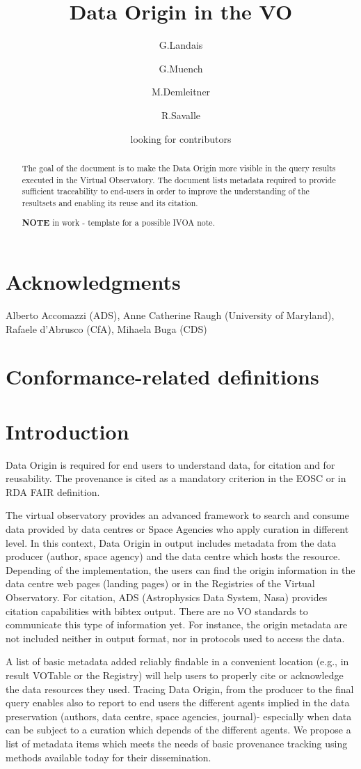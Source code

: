 \documentclass[11pt,a4paper]{ivoa}
\title{Data Origin in the VO}
\author{G.Landais}
\author{G.Muench}
\author{M.Demleitner}
\author{R.Savalle}
\author{looking for contributors}
\begin{document}
\begin{abstract}
The goal of the document is to make the Data Origin more visible in the query results executed in the Virtual Observatory.
The document lists metadata required to provide sufficient traceability to end-users in order to improve the understanding
of the resultsets and enabling its reuse and its citation.

\textbf{NOTE} in work -  template for a possible IVOA note.


\end{abstract}


\section*{Acknowledgments}
Alberto Accomazzi (ADS), Anne Catherine Raugh (University of Maryland), Rafaele d'Abrusco (CfA), Mihaela Buga (CDS)

\section*{Conformance-related definitions}


\section{Introduction}

Data Origin is required for end users to understand data, for citation and for reusability. The  provenance is cited as a mandatory criterion in the EOSC or in RDA FAIR definition.

The virtual observatory provides an advanced framework to search and consume data provided by data centres or Space Agencies who apply curation in different level.  In this context, Data Origin in output includes metadata from the data producer (author, space agency) and the data centre which hosts the resource.
Depending of the implementation, the users can find the origin information in the data centre web pages (landing pages) or in the Registries of the Virtual Observatory. For citation, ADS (Astrophysics Data System, Nasa) provides citation capabilities with bibtex output. There are no VO standards to communicate this type of information yet. For instance, the origin metadata are not included neither in output format, nor in protocols used to access the data.

A list of basic metadata added reliably findable in a convenient location (e.g.,
in result VOTable or the Registry) will help users to properly cite or
acknowledge the data resources they used.
Tracing Data Origin, from the producer to the final query enables also to report to end users the different agents implied in the data preservation (authors, data centre, space agencies, journal)- especially when data can be subject to a curation  which depends of the different agents.
We propose a list of metadata items which meets the needs of basic provenance
tracking using methods available today for their dissemination.
\end{document}
